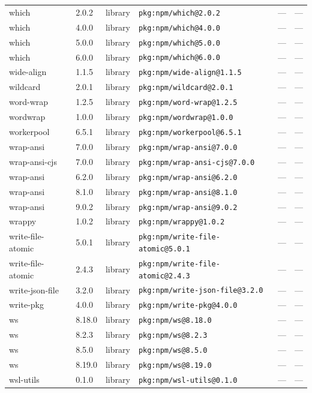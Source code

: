 \documentclass[11pt]{article}
\begin{document}
\begin{longtable}{|l|l|l|p{2.2cm}|l|p{4cm}|}
which & 2.0.2 & library & \texttt{pkg:npm/which@2.0.2} & — & — \\
which & 4.0.0 & library & \texttt{pkg:npm/which@4.0.0} & — & — \\
which & 5.0.0 & library & \texttt{pkg:npm/which@5.0.0} & — & — \\
which & 6.0.0 & library & \texttt{pkg:npm/which@6.0.0} & — & — \\
wide-align & 1.1.5 & library & \texttt{pkg:npm/wide-align@1.1.5} & — & — \\
wildcard & 2.0.1 & library & \texttt{pkg:npm/wildcard@2.0.1} & — & — \\
word-wrap & 1.2.5 & library & \texttt{pkg:npm/word-wrap@1.2.5} & — & — \\
wordwrap & 1.0.0 & library & \texttt{pkg:npm/wordwrap@1.0.0} & — & — \\
workerpool & 6.5.1 & library & \texttt{pkg:npm/workerpool@6.5.1} & — & — \\
wrap-ansi & 7.0.0 & library & \texttt{pkg:npm/wrap-ansi@7.0.0} & — & — \\
wrap-ansi-cjs & 7.0.0 & library & \texttt{pkg:npm/wrap-ansi-cjs@7.0.0} & — & — \\
wrap-ansi & 6.2.0 & library & \texttt{pkg:npm/wrap-ansi@6.2.0} & — & — \\
wrap-ansi & 8.1.0 & library & \texttt{pkg:npm/wrap-ansi@8.1.0} & — & — \\
wrap-ansi & 9.0.2 & library & \texttt{pkg:npm/wrap-ansi@9.0.2} & — & — \\
wrappy & 1.0.2 & library & \texttt{pkg:npm/wrappy@1.0.2} & — & — \\
write-file-atomic & 5.0.1 & library & \texttt{pkg:npm/write-file-atomic@5.0.1} & — & — \\
write-file-atomic & 2.4.3 & library & \texttt{pkg:npm/write-file-atomic@2.4.3} & — & — \\
write-json-file & 3.2.0 & library & \texttt{pkg:npm/write-json-file@3.2.0} & — & — \\
write-pkg & 4.0.0 & library & \texttt{pkg:npm/write-pkg@4.0.0} & — & — \\
ws & 8.18.0 & library & \texttt{pkg:npm/ws@8.18.0} & — & — \\
ws & 8.2.3 & library & \texttt{pkg:npm/ws@8.2.3} & — & — \\
ws & 8.5.0 & library & \texttt{pkg:npm/ws@8.5.0} & — & — \\
ws & 8.19.0 & library & \texttt{pkg:npm/ws@8.19.0} & — & — \\
wsl-utils & 0.1.0 & library & \texttt{pkg:npm/wsl-utils@0.1.0} & — & — \\

\end{longtable}
\end{document}
